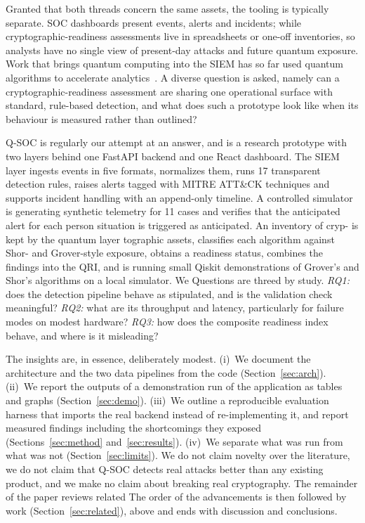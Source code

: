 \documentclass[conference]{IEEEtran}
\begin{document}
Granted that both threads concern the same assets, the tooling is typically separate. SOC dashboards present events, alerts and incidents; while cryptographic-readiness assessments live in spreadsheets or one-off inventories, so analysts have no single view of present-day attacks and future quantum exposure. Work that brings quantum computing into the SIEM has so far used quantum algorithms to accelerate analytics~\cite{tehrani2024}. A diverse question is asked, namely can a cryptographic-readiness assessment are sharing one operational surface with standard, rule-based detection, and what does such a prototype look like when its behaviour is measured rather than outlined?

Q-SOC is regularly our attempt at an answer, and is a research prototype with two layers behind one FastAPI backend and one React dashboard. The SIEM layer ingests events in five formats, normalizes them, runs 17 transparent detection rules, raises alerts tagged with MITRE ATT\&CK techniques and supports incident handling with an append-only timeline. A controlled simulator is generating synthetic telemetry for 11 cases and verifies that the anticipated alert for each person situation is triggered as anticipated. An inventory of cryp- is kept by the quantum layer tographic assets, classifies each algorithm against Shor- and Grover-style exposure, obtains a readiness status, combines the findings into the QRI, and is running small Qiskit demonstrations of Grover's and Shor's algorithms on a local simulator. We Questions are threed by study. \emph{RQ1:} does the detection pipeline behave as stipulated, and is the validation check meaningful? \emph{RQ2:} what are its throughput and latency, particularly for failure modes on modest hardware? \emph{RQ3:} how does the composite readiness index behave, and where is it misleading?

The insights are, in essence, deliberately modest. (i)~We document the architecture and the two data pipelines from the code (Section~\ref{sec:arch}). (ii)~We report the outputs of a demonstration run of the application as tables and graphs (Section~\ref{sec:demo}). (iii)~We outline a reproducible evaluation harness that imports the real backend instead of re-implementing it, and report measured findings including the shortcomings they exposed (Sections~\ref{sec:method} and~\ref{sec:results}). (iv)~We separate what was run from what was not (Section~\ref{sec:limits}). We do not claim novelty over the literature, we do not claim that Q-SOC detects real attacks better than any existing product, and we make no claim about breaking real cryptography. The remainder of the paper reviews related The order of the advancements is then followed by work (Section~\ref{sec:related}), above and ends with discussion and conclusions.
\end{document}
